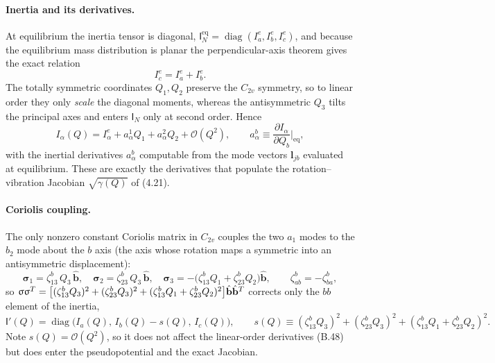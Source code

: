 \paragraph{Inertia and its derivatives.}
At equilibrium the inertia tensor is diagonal, $\mathsf I_N^{\mathrm{eq}}=\operatorname{diag}(I_a^{e},I_b^{e},I_c^{e})$, and because the equilibrium mass distribution is planar the perpendicular-axis theorem gives the exact relation
\begin{equation}
I_c^{e}=I_a^{e}+I_b^{e}. \tag{B.47}
\end{equation}
The totally symmetric coordinates $Q_1,Q_2$ preserve the $C_{2v}$ symmetry, so to linear order they only \emph{scale} the diagonal moments, whereas the antisymmetric $Q_3$ tilts the principal axes and enters $\mathsf I_N$ only at second order. Hence
\begin{equation}
I_\alpha(Q)=I_\alpha^{e}+a_\alpha^{1}Q_1+a_\alpha^{2}Q_2+\mathcal O(Q^2),
\qquad a_\alpha^{b}\equiv\frac{\partial I_\alpha}{\partial Q_b}\Big|_{\mathrm{eq}}, \tag{B.48}
\end{equation}
with the inertial derivatives $a_\alpha^{b}$ computable from the mode vectors $\mathbf l_{jb}$ evaluated at equilibrium. These are exactly the derivatives that populate the rotation--vibration Jacobian $\sqrt{\gamma(Q)}$ of (4.21).

\paragraph{Coriolis coupling.}
The only nonzero constant Coriolis matrix in $C_{2v}$ couples the two $a_1$ modes to the $b_2$ mode about the $b$ axis (the axis whose rotation maps a symmetric into an antisymmetric displacement):
\begin{equation}
\boldsymbol\sigma_1=\zeta^{b}_{13}\,Q_3\,\hat{\mathbf b},\quad
\boldsymbol\sigma_2=\zeta^{b}_{23}\,Q_3\,\hat{\mathbf b},\quad
\boldsymbol\sigma_3=-\bigl(\zeta^{b}_{13}Q_1+\zeta^{b}_{23}Q_2\bigr)\hat{\mathbf b},
\qquad \zeta^{b}_{ab}=-\zeta^{b}_{ba}, \tag{B.49}
\end{equation}
so $\upsigma\upsigma^{T}=\bigl[(\zeta^{b}_{13}Q_3)^2+(\zeta^{b}_{23}Q_3)^2+(\zeta^{b}_{13}Q_1+\zeta^{b}_{23}Q_2)^2\bigr]\hat{\mathbf b}\hat{\mathbf b}^{T}$ corrects only the $bb$ element of the inertia,
\begin{equation}
\mathsf I'(Q)=\operatorname{diag}\!\bigl(I_a(Q),\,I_b(Q)-s(Q),\,I_c(Q)\bigr),\qquad
s(Q)\equiv(\zeta^{b}_{13}Q_3)^2+(\zeta^{b}_{23}Q_3)^2+(\zeta^{b}_{13}Q_1+\zeta^{b}_{23}Q_2)^2 . \tag{B.50}
\end{equation}
Note $s(Q)=\mathcal O(Q^2)$, so it does not affect the linear-order derivatives (B.48) but does enter the pseudopotential and the exact Jacobian.

